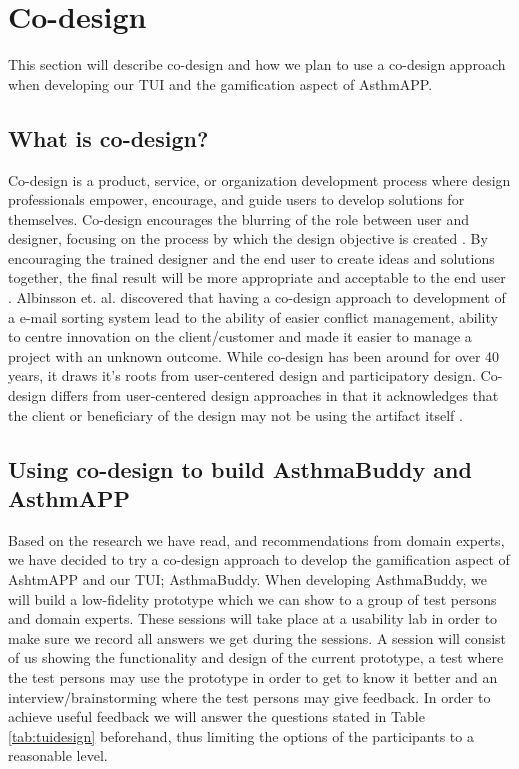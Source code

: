 \section{Co-design}
\label{sec:codesign}
This section will describe co-design and how we plan to use a co-design approach when developing our TUI and the gamification aspect of AsthmAPP.

\subsection{What is co-design?}
Co-design is a product, service, or organization development process where design professionals empower, encourage, and guide users to develop solutions for themselves. Co-design encourages the blurring of the role between user and designer, focusing on the process by which the design objective is created \cite{sanders2008co}. By encouraging the trained designer and the end user to create ideas and solutions together, the final result will be more appropriate and acceptable to the end user \cite{albinsson2007co}. 
Albinsson et. al. \cite{albinsson2007co} discovered that having a co-design approach to development of a e-mail sorting system lead to the ability of easier conflict management, ability to centre innovation on the client/customer and made it easier to manage a project with an unknown outcome. While co-design has been around for over 40 years, it draws it's roots from user-centered design and participatory design. Co-design differs from user-centered design approaches in that it acknowledges that the client or beneficiary of the design may not be using the artifact itself \cite{norman1986user}.



\subsection{Using co-design to build AsthmaBuddy and AsthmAPP}
Based on the research we have read, and recommendations from domain experts, we have decided to try a co-design approach to develop the gamification aspect of AshtmAPP and our TUI; AsthmaBuddy. 
When developing AsthmaBuddy, we will build a low-fidelity prototype which we can show to a group of test persons and domain experts. These sessions will take place at a usability lab in order to make sure we record all answers we get during the sessions. A session will consist of us showing the functionality and design of the current prototype, a test where the test persons may use the prototype in order to get to know it better and an interview/brainstorming where the test persons may give feedback. In order to achieve useful feedback we will answer the questions stated in Table \ref{tab:tuidesign} beforehand, thus limiting the options of the participants to a reasonable level. 

